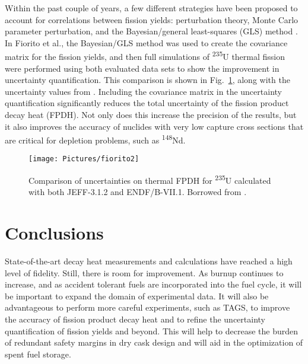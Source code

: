 \documentclass{anstrans}
\begin{document}
Within the past couple of years, a few different strategies have been proposed to account for correlations between fission yields: perturbation theory, Monte Carlo parameter perturbation, and the Bayesian/general least-squares (GLS) method \cite{Fior2014}. In Fiorito et al., the Bayesian/GLS method was used to create the covariance matrix for the fission yields, and then full simulations of \textsuperscript{235}U thermal fission were performed using both evaluated data sets to show the improvement in uncertainty quantification. This comparison is shown in Fig.~\ref{fig:fior2}, along with the uncertainty values from \cite{Tobi1989}. Including the covariance matrix in the uncertainty quantification significantly reduces the total uncertainty of the fission product decay heat (FPDH). Not only does this increase the precision of the results, but it also improves the accuracy of nuclides with very low capture cross sections that are critical for depletion problems, such as \textsuperscript{148}Nd.
\begin{figure}[ht]
 \centering
 \texttt{[image: Pictures/fiorito2]}
 \caption{Comparison of uncertainties on thermal FPDH for \textsuperscript{235}U calculated with both JEFF-3.1.2 and ENDF/B-VII.1. Borrowed from \cite{Fior2014}.}
 \label{fig:fior2}
\end{figure}

\section{Conclusions}
State-of-the-art decay heat measurements and calculations have reached a high level of fidelity. Still, there is room for improvement. As burnup continues to increase, and as accident tolerant fuels are incorporated into the fuel cycle, it will be important to expand the domain of experimental data. It will also be advantageous to perform more careful experiments, such as TAGS, to improve the accuracy of fission product decay heat and to refine the uncertainty quantification of fission yields and beyond. This will help to decrease the burden of redundant safety margins in dry cask design and will aid in the optimization of spent fuel storage.



\end{document}
